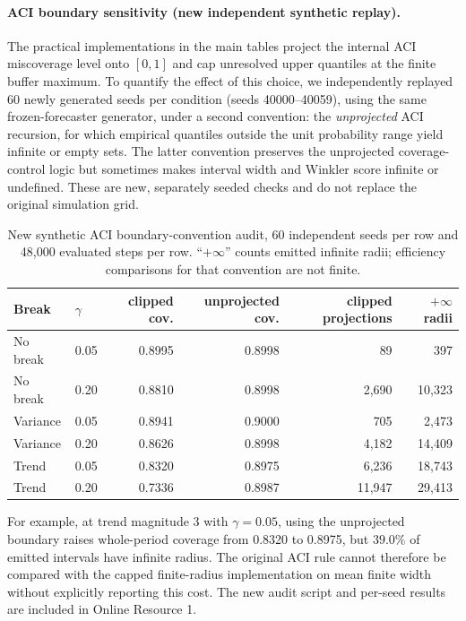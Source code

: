 \documentclass[10pt]{article}
\begin{document}
\paragraph{ACI boundary sensitivity (new independent synthetic replay).}
The practical implementations in the main tables project the internal ACI
miscoverage level onto $[0,1]$ and cap unresolved upper quantiles at the finite
buffer maximum. To quantify the effect of this choice, we independently
replayed $60$ newly generated seeds per condition (seeds 40000--40059), using
the same frozen-forecaster generator, under a second convention: the
\emph{unprojected} ACI recursion, for which empirical quantiles outside the
unit probability range yield infinite or empty sets. The latter convention
preserves the unprojected coverage-control logic but sometimes makes interval
width and Winkler score infinite or undefined. These are new, separately
seeded checks and do not replace the original simulation grid.
\begin{table}[t]
\centering\small
\caption{New synthetic ACI boundary-convention audit, 60 independent seeds per
row and 48,000 evaluated steps per row. ``$+\infty$'' counts emitted infinite
radii; efficiency comparisons for that convention are not finite.}
\label{tab:aci-boundary}
\begin{tabular}{llrrrr}
\toprule
Break & $\gamma$ & clipped cov. & unprojected cov. & clipped projections & $+\infty$ radii \\
\midrule
No break & 0.05 & 0.8995 & 0.8998 & 89 & 397 \\
No break & 0.20 & 0.8810 & 0.8998 & 2,690 & 10,323 \\
Variance & 0.05 & 0.8941 & 0.9000 & 705 & 2,473 \\
Variance & 0.20 & 0.8626 & 0.8998 & 4,182 & 14,409 \\
Trend & 0.05 & 0.8320 & 0.8975 & 6,236 & 18,743 \\
Trend & 0.20 & 0.7336 & 0.8987 & 11,947 & 29,413 \\
\bottomrule
\end{tabular}
\end{table}
For example, at trend magnitude 3 with $\gamma=0.05$, using the unprojected
boundary raises whole-period coverage from 0.8320 to 0.8975, but $39.0\%$
of emitted intervals have infinite radius. The original ACI rule cannot
therefore be compared with the capped finite-radius implementation on mean
finite width without explicitly reporting this cost. The new audit script and
per-seed results are included in Online Resource 1.
\end{document}
